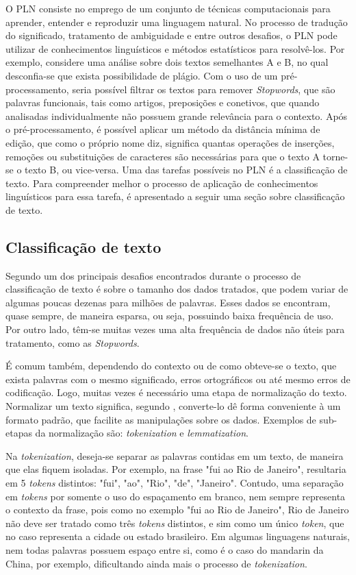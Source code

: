 O PLN consiste no emprego de um conjunto de técnicas computacionais para aprender, entender e reproduzir uma linguagem natural. No processo de tradução do significado, tratamento de ambiguidade e entre outros desafios, o PLN pode utilizar de conhecimentos linguísticos e métodos estatísticos para resolvê-los. Por exemplo, considere uma análise sobre dois textos semelhantes A e B, no qual desconfia-se que exista possibilidade de plágio. Com o uso de um pré-processamento, seria possível filtrar os textos para remover \textit{Stopwords}, que são palavras funcionais, tais como artigos, preposições e conetivos, que quando analisadas individualmente não possuem grande relevância para o contexto. Após o pré-processamento, é possível aplicar um método da distância mínima de edição, que como o próprio nome diz, significa quantas operações de inserções, remoções ou substituições de caracteres são necessárias para que o texto A torne-se o texto B, ou vice-versa. Uma das tarefas possíveis no PLN é a classificação de texto. Para compreender melhor o processo de aplicação de conhecimentos linguísticos para essa tarefa, é apresentado a seguir uma seção sobre classificação de texto.

\subsection{Classificação de texto}
Segundo \cite{aggarwal2014data} um dos principais desafios encontrados durante o processo de classificação de texto é sobre o tamanho dos dados tratados, que podem variar de algumas poucas dezenas para milhões de palavras. Esses dados se encontram, quase sempre, de maneira esparsa, ou seja, possuindo baixa frequência de uso. Por outro lado, têm-se muitas vezes uma alta frequência de dados não úteis para tratamento, como as \textit{Stopwords}.

É comum também, dependendo do contexto ou de como obteve-se o texto, que exista palavras com o mesmo significado, erros ortográficos ou até mesmo erros de codificação. Logo, muitas vezes é necessário uma etapa de normalização do texto. Normalizar um texto significa, segundo \citep{martin2018speech}, converte-lo dê forma conveniente à um formato padrão, que facilite as manipulações sobre os dados. Exemplos de sub-etapas da normalização são: \textit{tokenization} e \textit{lemmatization}. 

Na \textit{tokenization}, deseja-se separar as palavras contidas em um texto, de maneira que elas fiquem isoladas. Por exemplo, na frase "fui ao Rio de Janeiro", resultaria em 5 \textit{tokens} distintos: "fui", "ao", "Rio", "de", "Janeiro". Contudo, uma separação em \textit{tokens} por somente o uso do espaçamento em branco, nem sempre representa o contexto da frase, pois como no exemplo "fui ao Rio de Janeiro", Rio de Janeiro não deve ser tratado como três \textit{tokens} distintos, e sim como um único \textit{token}, que no caso representa a cidade ou estado brasileiro. Em algumas linguagens naturais, nem todas palavras possuem espaço entre si, como é o caso do mandarin da China, por exemplo, dificultando ainda mais o processo de \textit{tokenization}. 

